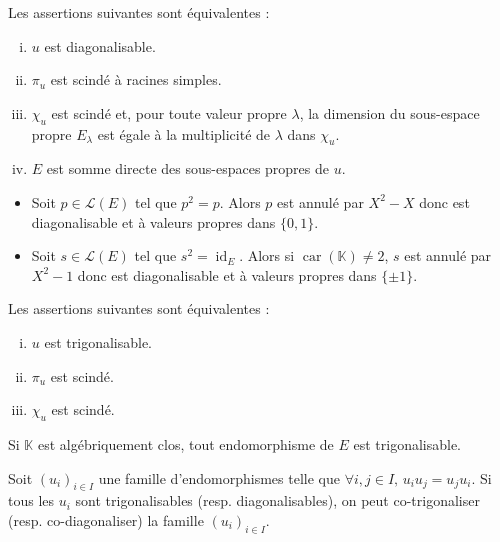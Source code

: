 	
	\begin{theorem}
		Les assertions suivantes sont équivalentes :
		\begin{enumerate}[(i)]
			\item $u$ est diagonalisable.
			\item $\pi_u$ est scindé à racines simples.
			\item $\chi_u$ est scindé et, pour toute valeur propre $\lambda$, la dimension du sous-espace propre $E_\lambda$ est égale à la multiplicité de $\lambda$ dans $\chi_u$.
			\item $E$ est somme directe des sous-espaces propres de $u$.
		\end{enumerate}
	\end{theorem}
	
	\begin{example}
		\begin{itemize}
			\item Soit $p \in \mathcal{L}(E)$ tel que $p^2 = p$. Alors $p$ est annulé par $X^2 - X$ donc est diagonalisable et à valeurs propres dans $\{ 0, 1 \}$.
			\item Soit $s \in \mathcal{L}(E)$ tel que $s^2 = \operatorname{id}_E$. Alors si $\operatorname{car}(\mathbb{K}) \neq 2$, $s$ est annulé par $X^2 - 1$ donc est diagonalisable et à valeurs propres dans $\{ \pm 1 \}$.
		\end{itemize}
	\end{example}
	
	\begin{theorem}
		Les assertions suivantes sont équivalentes :
		\begin{enumerate}[(i)]
			\item $u$ est trigonalisable.
			\item $\pi_u$ est scindé.
			\item $\chi_u$ est scindé.
		\end{enumerate}
	\end{theorem}
	
	\begin{example}
		Si $\mathbb{K}$ est algébriquement clos, tout endomorphisme de $E$ est trigonalisable.
	\end{example}
	
	\begin{theorem}
		\label{151-1}
		Soit $(u_i)_{i \in I}$ une famille d'endomorphismes telle que $\forall i, j \in I, \, u_i u_j = u_j u_i$. Si tous les $u_i$ sont trigonalisables (resp. diagonalisables), on peut co-trigonaliser (resp. co-diagonaliser) la famille $(u_i)_{i \in I}$.
	\end{theorem}
	
